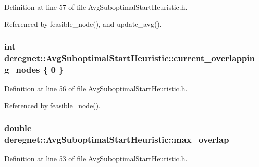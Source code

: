 Definition at line 57 of file Avg\+Suboptimal\+Start\+Heuristic.\+h.



Referenced by feasible\+\_\+node(), and update\+\_\+avg().

\subsubsection[{\texorpdfstring{current\+\_\+overlapping\+\_\+nodes}{current_overlapping_nodes}}]{\setlength{\rightskip}{0pt plus 5cm}int deregnet\+::\+Avg\+Suboptimal\+Start\+Heuristic\+::current\+\_\+overlapping\+\_\+nodes \{ 0 \}\hspace{0.3cm}{\ttfamily [private]}}\hypertarget{classderegnet_1_1AvgSuboptimalStartHeuristic_ad541b941d327ba928a7951e43ad1fea4}{}\label{classderegnet_1_1AvgSuboptimalStartHeuristic_ad541b941d327ba928a7951e43ad1fea4}


Definition at line 56 of file Avg\+Suboptimal\+Start\+Heuristic.\+h.



Referenced by feasible\+\_\+node().

\subsubsection[{\texorpdfstring{max\+\_\+overlap}{max_overlap}}]{\setlength{\rightskip}{0pt plus 5cm}double deregnet\+::\+Avg\+Suboptimal\+Start\+Heuristic\+::max\+\_\+overlap\hspace{0.3cm}{\ttfamily [private]}}\hypertarget{classderegnet_1_1AvgSuboptimalStartHeuristic_a6e019ada1557663d456e7f81757d14ab}{}\label{classderegnet_1_1AvgSuboptimalStartHeuristic_a6e019ada1557663d456e7f81757d14ab}


Definition at line 53 of file Avg\+Suboptimal\+Start\+Heuristic.\+h.




